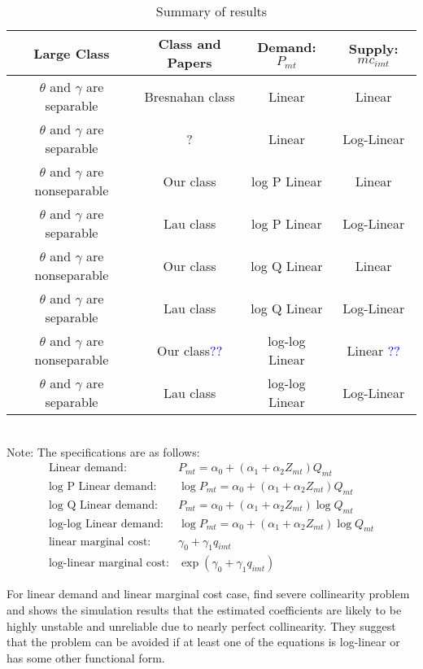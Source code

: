 \documentclass[11pt, a4paper]{article}
\begin{document}
\begin{table}[!ht]
\caption{Summary of results}
\centering
\scriptsize
\begin{tabular}{c|c|c|c} 
 \hline
 Large Class & Class and Papers & Demand: $P_{mt}$ &  Supply: $mc_{imt}$ \\ 
 \hline
 $\theta$ and $\gamma$ are separable &Bresnahan class \citep{merel2009measuring}& Linear  &  Linear \\ 
 $\theta$ and $\gamma$ are separable&? \citep{perloff2012collinearity} & Linear  &  Log-Linear \\  
 $\theta$ and $\gamma$ are nonseparable&Our class & log P Linear  &  Linear \\ 
 $\theta$ and $\gamma$ are separable &Lau class & log P Linear  &  Log-Linear \\ 
 $\theta$ and $\gamma$ are nonseparable&Our class & log Q Linear  &  Linear \\ 
 $\theta$ and $\gamma$ are separable&Lau class \citep{coccorese2013multimarket}& log Q Linear  &  Log-Linear\\ 
 $\theta$ and $\gamma$ are nonseparable&Our class\citep{okazaki2022excess,merel2009measuring}\textcolor{blue}{??}& log-log Linear  &  Linear  \textcolor{blue}{??} \\ 
  $\theta$ and $\gamma$ are separable&Lau class \citep{hyde1995can}& log-log Linear  &  Log-Linear\\ 
 \hline
\end{tabular}
\label{tb:summary_of_results}
\\
\footnotesize Note: The specifications are as follows:
\begin{align*}
    \text{Linear demand:}& P_{mt}=\alpha_0+(\alpha_1+\alpha_2 Z_{mt}) Q_{mt}\\
    \text{log P Linear demand:}&
    \log P_{mt}=\alpha_0+(\alpha_1+\alpha_2 Z_{mt}) Q_{mt}\\
    \text{log Q Linear demand:}&    P_{mt}=\alpha_0+(\alpha_1+\alpha_2 Z_{mt}) \log Q_{mt}\\
    \text{log-log Linear demand:}&
    \log P_{mt}=\alpha_0+(\alpha_1+\alpha_2 Z_{mt})\log Q_{mt}\\
    \text{linear marginal cost}:&
    \gamma_0+\gamma_1 q_{imt}\\
    \text{log-linear marginal cost}:&
    \exp(\gamma_0+\gamma_1 q_{imt})
\end{align*}
\end{table}

For linear demand and linear marginal cost case, \cite{perloff2012collinearity} find severe collinearity problem and shows the simulation results that the estimated coefficients are likely to be highly unstable and unreliable due to nearly perfect collinearity. They suggest that the problem can be avoided if at least one of the equations is log-linear or has some other functional form.
\end{document}
